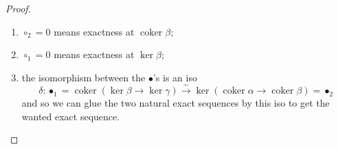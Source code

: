 \documentclass[a4paper]{article}
\DeclareMathOperator{\coker}{coker}
\theoremstyle{plain}
\theoremstyle{definition}
\begin{document}
\begin{proof}
			\begin{enumerate}[label=(\roman*)]
				\item $\circ_2 = 0$ means exactness at $\coker\beta$;
				\item $\circ_1 = 0$ means exactness at $\ker\beta$;
				\item the isomorphism between the $\bullet$'s is an iso
				\[
					\delta\colon \bullet_1 =   \coker(\ker\beta \to \ker\gamma)  \xrightarrow{\sim} \ker(\coker\alpha \to \coker\beta) = \bullet_2
				\]
				and so we can glue the two natural exact sequences by this iso to get the wanted exact sequence. \qedhere
			\end{enumerate}
		\end{proof}
	\pagebreak
	\printbibliography
\end{document}
